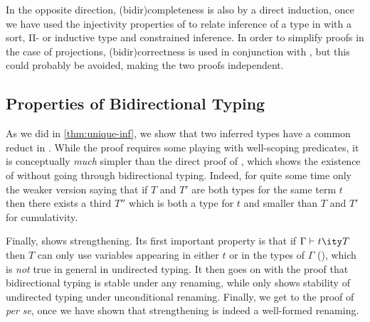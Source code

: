 In the opposite direction, \kl(bidir){completeness}%
is also by a direct induction, once we have used
the injectivity properties of  to relate inference of a type
in  with a sort, Π- or inductive type and constrained inference.
In order to simplify proofs in the case of projections, \kl(bidir){correctness} is used in conjunction
with , but this could probably be avoided, making the two proofs independent.

\subsection{Properties of Bidirectional Typing}

As we did in \cref{thm:unique-inf}, we show that two inferred types have a common reduct in
. While the proof requires some playing with
well-scoping predicates,%
it is conceptually \emph{much} simpler than the direct proof of ,
which shows the existence of  without going through bidirectional typing.
Indeed, for quite some time only the weaker version saying that if $T$ and $T'$ are both types
for the same term $t$ then there exists a third $T''$ which is both a type for $t$ and smaller than 
$T$ and $T'$ for cumulativity.

Finally,  shows strengthening.
Its first important property is that if $\Gamma \vdash t \ity T$ then
$T$ can only use variables appearing in either $t$ or in the types of $\Gamma$
(),
which is \emph{not} true in general in undirected typing.%
It then goes on with the proof that bidirectional typing is stable under any renaming, while
 only shows stability of undirected typing under unconditional renaming.
Finally, we get to the proof of 
\textit{per se}, once we have shown that strengthening is indeed a well-formed renaming.

